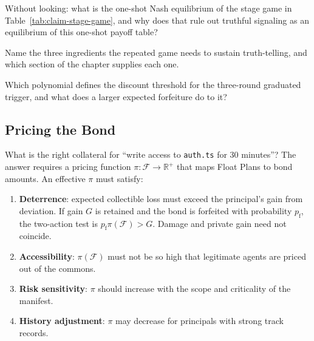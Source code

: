 \documentclass[11pt,a4paper]{article}
\theoremstyle{definition}
\theoremstyle{remark}
\begin{document}



\pdexercisepointer*{\ref{ex:bonded-threshold-hand}}{\ref{ex:bonded-sweep-crossover}}{\pageref{ex:bonded-threshold-hand}}

\begin{pdrecitation}
\item Without looking: what is the one-shot Nash equilibrium of the stage game in Table~\ref{tab:claim-stage-game}, and why does that rule out truthful signaling as an equilibrium of this one-shot payoff table?
\item Name the three ingredients the repeated game needs to sustain truth-telling, and which section of the chapter supplies each one.
\item Which polynomial defines the discount threshold for the three-round graduated trigger, and what does a larger expected forfeiture do to it?
\end{pdrecitation}

\subsection{Pricing the Bond}\label{sec:pricing}

What is the right collateral for ``write access to \texttt{auth.ts} for 30 minutes''? The answer requires a pricing function $\pi: \mathcal{F} \rightarrow \mathbb{R}^{+}$ that maps Float Plans to bond amounts. An effective $\pi$ must satisfy:

\begin{enumerate}[nosep]
  \item \textbf{Deterrence}: expected collectible loss must exceed the
principal's gain from deviation. If gain $G$ is retained and the bond is
forfeited with probability $p_{\mathrm f}$, the two-action test is $p_{\mathrm f}\pi(\mathcal F)>G$.
Damage and private gain need not coincide.
  \item \textbf{Accessibility}: $\pi(\mathcal{F})$ must not be so high that legitimate agents are priced out of the commons.
  \item \textbf{Risk sensitivity}: $\pi$ should increase with the scope and criticality of the manifest.
  \item \textbf{History adjustment}: $\pi$ may decrease for principals with strong track records.
\end{enumerate}
\end{document}
